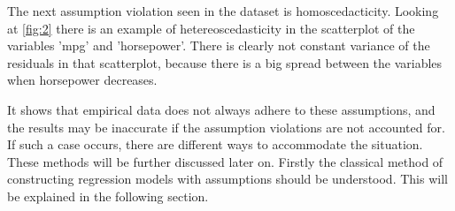 \noindent The next assumption violation seen in the dataset is homoscedacticity. Looking at \autoref{fig:2} there is an example of hetereoscedasticity in the scatterplot of the variables 'mpg' and 'horsepower'. There is clearly not constant variance of the residuals in that scatterplot, because there is a big spread between the variables when horsepower decreases. \newline

\noindent It shows that empirical data does not always adhere to these assumptions, and the results may be inaccurate if the assumption violations are not accounted for. If such a case occurs, there are different ways to accommodate the situation. These methods will be further discussed later on. Firstly the classical method of constructing regression models with assumptions should be understood. This will be explained in the following section.\newline

 


